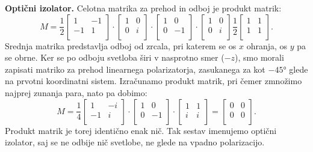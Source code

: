 \begin{example}{\bf Optični izolator.}
Celotna matrika za prehod in odboj je produkt matrik:
\begin{equation}
 M = \frac{1}{2}\left[\begin{array}{cc}
1 & -1 \\
-1 & 1\\
\end{array}\right]\cdot 
\left[\begin{array}{cc}
1 & 0 \\
0 & i\\
\end{array}\right]\cdot 
\left[\begin{array}{cc}
1 & 0 \\
0 & -1\\
\end{array}\right]\cdot
\left[\begin{array}{cc}
1 & 0 \\
0 & i\\
\end{array}\right]
\frac{1}{2}\left[\begin{array}{cc}
1 &  1 \\
1 & 1\\
\end{array}\right]\!\!.
\label{eq:03_61}
\end{equation}
Srednja matrika predstavlja odboj od zrcala, pri katerem se os $x$ ohranja, 
os $y$ pa se obrne. Ker se po odboju svetloba širi v nasprotno
smer ($-z$), smo morali zapisati matriko za prehod linearnega polarizatorja,
zasukanega za kot $-45\si{\degree}$ glede na prvotni koordinatni sistem. 
Izračunamo produkt matrik, pri čemer zmnožimo najprej zunanja para, nato pa dobimo:
\begin{equation}
 M = \frac{1}{4}\left[\begin{array}{cc}
1 & -i \\
-1 & i\\
\end{array}\right]\cdot 
\left[\begin{array}{cc}
1 & 0 \\
0 & -1\\
\end{array}\right]
\cdot 
\left[\begin{array}{cc}
1 &  1 \\
i & i\\
\end{array}\right] = 
\left[\!\!\begin{array}{cc}
0 & 0\\
0 & 0\\
\end{array}\right]\!\!.
\label{eq:03_63}
\end{equation}
Produkt matrik je torej identično enak nič. Tak sestav imenujemo
optični izolator, saj se ne odbije nič svetlobe, ne glede na vpadno 
polarizacijo. 
\end{example}

